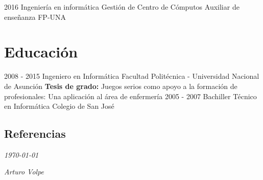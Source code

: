 \documentclass[]{friggeri-cv}
\begin{document}
\clase
    {2016}
    {Ingeniería en informática}
    {Gestión de Centro de Cómputos} 
    {Auxiliar de enseñanza}
    {FP-UNA}
    {}

\newpage
\section{Educación}
\begin{entrylist}
  \educacion
    {2008 - 2015}
    {Ingeniero en Informática}
    {Facultad Politécnica - Universidad Nacional de Asunción}
    {\textbf{Tesis de grado:} Juegos serios como apoyo a la formación de profesionales: Una aplicación al área de enfermería}
  \educacion
    {2005 - 2007}
    {Bachiller Técnico en Informática}
    {Colegio de San José}
    {}
\end{entrylist}

\begin{absolutelynopagebreak}
\section{Referencias}
\begin{entrylist}
\end{entrylist}
\end{absolutelynopagebreak}

\begin{flushleft}
    \emph{\today{}}
\end{flushleft}
\begin{flushright}
    \emph{Arturo Volpe}
\end{flushright}
\end{document}
